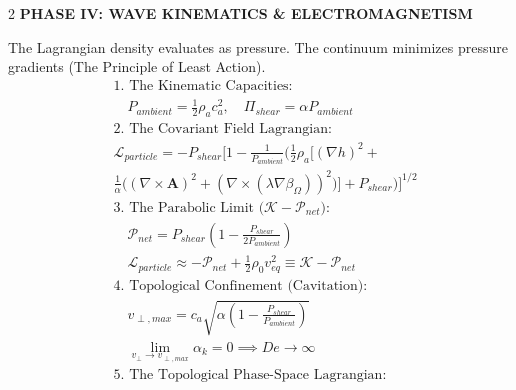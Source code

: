 \begin{multicols}{2}
\newpage
\vspace{0.4cm}
\noindent\textbf{\large \color{academiabrown} PHASE IV: WAVE KINEMATICS \& ELECTROMAGNETISM}
\vspace{0.2cm}

\begin{tcolorbox}[cheatbox, title={\refstepcounter{cheatnum}\label{box:unified_lagrangian}\thecheatnum. The Unified Lagrangian \& The Origin of Action \hfill\makebox[0pt][r]{\scriptsize\hyperref[sec:deriv_unified_lagrangian]{[Proof $\downarrow$]}}}]
The Lagrangian density evaluates as pressure. The continuum minimizes pressure gradients (The Principle of Least Action).
\begin{align}
    &\text{1. The Kinematic Capacities:} \nonumber \\
    &\quad P_{ambient} = \frac{1}{2}\rho_a c_a^2, \quad \Pi_{shear} = \alpha P_{ambient} \label{eq:kinematic_capacities} \\
    &\text{2. The Covariant Field Lagrangian:} \nonumber \\
    & \mathcal{L}_{particle} = - P_{shear} \Bigg[ 1 - \frac{1}{P_{ambient}} \Bigg( \frac{1}{2}\rho_a \Big[ (\nabla h)^2 + \nonumber \\
    &  \frac{1}{\alpha} \big( (\nabla \times \mathbf{A})^2 + (\nabla \times (\lambda \nabla \beta_\Omega))^2 \big) \Big] + P_{shear} \Bigg) \Bigg]^{1/2} \label{eq:dynamic_lagrangian} \\
    &\text{3. The Parabolic Limit ($\mathcal{K} - \mathcal{P}_{net}$):} \nonumber \\
    &\quad \mathcal{P}_{net} = P_{shear} \left( 1 - \frac{P_{shear}}{2 P_{ambient}} \right) \label{eq:net_potential} \\
    &\quad \mathcal{L}_{particle} \approx - \mathcal{P}_{net} + \frac{1}{2}\rho_0 v_{eq}^2 \equiv \mathcal{K} - \mathcal{P}_{net} \label{eq:classical_lagrangian_limit} \\
    &\text{4. Topological Confinement (Cavitation):} \nonumber \\
    &\quad v_{\perp, max} = c_a \sqrt{\alpha \left( 1 - \frac{P_{shear}}{P_{ambient}} \right)} \label{eq:max_transverse_velocity} \\
    &\quad \lim_{v_\perp \to v_{\perp, max}} \alpha_k = 0 \implies De \to \infty \label{eq:deborah_confinement} \\
    &\text{5. The Topological Phase-Space Lagrangian:} \nonumber \\

\end{align}
\end{tcolorbox}
\end{multicols}
